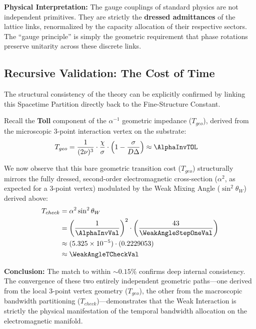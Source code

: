 \textbf{Physical Interpretation:} The gauge couplings of standard physics are not independent primitives. They are strictly the \textbf{dressed admittances} of the lattice links, renormalized by the capacity allocation of their respective sectors. The ``gauge principle'' is simply the geometric requirement that phase rotations preserve unitarity across these discrete links.

\subsection{Recursive Validation: The Cost of Time}

The structural consistency of the theory can be explicitly confirmed by linking this Spacetime Partition directly back to the Fine-Structure Constant. 

Recall the \textbf{Toll} component of the $\alpha^{-1}$ geometric impedance ($T_{geo}$), derived from the microscopic 3-point interaction vertex on the substrate:
\begin{equation}
\begin{split}
    T_{geo} &= \frac{1}{(2\nu)^3} \cdot \frac{\chi}{\sigma} \cdot \left(1 - \frac{\sigma}{D\Delta} \right) \approx \AlphaInvTOL
\end{split}
\end{equation}

We now observe that this bare geometric transition cost ($T_{geo}$) structurally mirrors the fully dressed, second-order electromagnetic cross-section ($\alpha^2$, as expected for a 3-point vertex) modulated by the Weak Mixing Angle ($\sin^2 \theta_W$) derived above:
\begin{equation}
\begin{split}
T_{check} &= \alpha^2 \sin^2 \theta_W \\
&= \left(\frac{1}{\AlphaInvVal}\right)^2 \cdot \left(\frac{43}{\WeakAngleStepOneVal}\right) \\
&\approx (5.325 \times 10^{-5}) \cdot (0.2229053) \\
&\approx \WeakAngleTCheckVal
\end{split}
\end{equation}

\textbf{Conclusion:} The match to within $\sim 0.15\%$ confirms deep internal consistency. The convergence of these two entirely independent geometric paths---one derived from the local 3-point vertex geometry ($T_{geo}$), the other from the macroscopic bandwidth partitioning ($T_{check}$)---demonstrates that the Weak Interaction is strictly the physical manifestation of the temporal bandwidth allocation on the electromagnetic manifold.